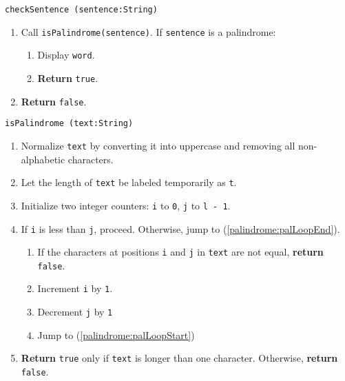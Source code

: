 \vspace{5mm}
{\tt checkSentence (sentence:String)}
\begin{enumerate}
	\item	Call {\tt isPalindrome(sentence)}. If {\tt sentence} is a palindrome:
	\begin{enumerate}
		\item	Display {\tt word}.
		\item	{\bf Return} {\tt true}.
	\end{enumerate}
\item	{\bf Return} {\tt false}.
\end{enumerate}
\vspace{5mm}
{\tt isPalindrome (text:String)}
\begin{enumerate}
	\item	Normalize {\tt text} by converting it into uppercase and removing all non-alphabetic characters.
	\item	Let the length of {\tt text} be labeled temporarily as {\tt t}.
	\item	Initialize two integer counters: {\tt i} to {\tt 0}, {\tt j} to {\tt l - 1}.
	\item	If {\tt i} is less than {\tt j}, proceed.
			Otherwise, jump to (\ref{palindrome:palLoopEnd}). \label{palindrome:palLoopStart}
	\begin{enumerate}
		\item	If the characters at positions {\tt i} and {\tt j} in {\tt text} are not equal,
				{\bf return} {\tt false}.
		\item	Increment {\tt i} by {\tt 1}.
		\item	Decrement {\tt j} by {\tt 1}
		\item	Jump to (\ref{palindrome:palLoopStart})
	\end{enumerate}
	\item	{\bf Return} {\tt true} only if {\tt text} is longer than
			one character. Otherwise, {\bf return} {\tt false}. \label{palindrome:palLoopEnd}
\end{enumerate}


\sourcecode
